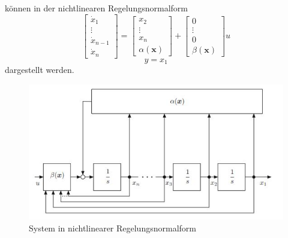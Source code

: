 		können in der nichtlinearen Regelungsnormalform
		\[\begin{bmatrix}\dot{x}_{1}\\\vdots\\ \dot{x}_{n-1}\\\dot{x}_{n}\end{bmatrix} =
		\begin{bmatrix}x_{2}\\\vdots\\ x_{n}\\\alpha(\bm{x})\end{bmatrix} + 
		\begin{bmatrix}0\\\vdots\\ 0\\\beta(\bm{x})\end{bmatrix}u\]
		\[y = x_{1}\]	
		dargestellt werden.
		\begin{figure}[h]
			\centering
			\includegraphics[width=0.6\linewidth]{./pics/re/nlrnf}
			\caption{System in nichtlinearer Regelungsnormalform}
			\label{}
		\end{figure}
